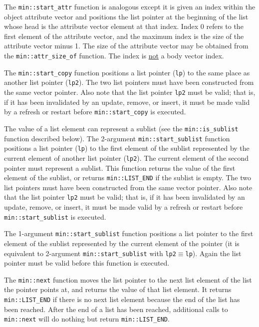 \documentclass[12pt]{article}
\newcommand{\EOL}{\penalty \exhyphenpenalty}
\begin{document}
The {\tt min::\EOL start\_\EOL attr} function is analogous except it is given
an index within the object attribute vector and positions the list pointer
at the beginning of the list whose head is the attribute vector element
at that index.  Index 0 refers to the first element of the attribute vector,
and the maximum index is the size of the attribute vector minus 1.
The size of the attribute vector may be obtained from the
{\tt min::\EOL attr\_\EOL size\_\EOL of} function.
The index is \underline{not} a body vector index.

The {\tt min::\EOL start\_\EOL copy} function
positions a list pointer ({\tt lp})
to the same place as another list pointer ({\tt lp2}).
The two list pointers must have been constructed from the same
vector pointer.
Also note that the list pointer {\tt lp2}
must be valid; that is, if it has been invalidated by
an update, remove, or insert, it must be made valid by a refresh or restart
before {\tt min::\EOL start\_\EOL copy} is executed.

The value of a list element can represent a sublist
(see the {\tt min::\EOL is\_\EOL sublist} function described below).
The 2-argument {\tt min::\EOL start\_\EOL sublist} function
positions a list pointer ({\tt lp})
to the first element of the sublist represented by the current
element of another list pointer ({\tt lp2}).
The current element of the second pointer must represent a sublist.
This function returns the value of the first element of
the sublist, or returns {\tt min::\EOL LIST\_\EOL END} if the sublist is empty.
The two list pointers must have been constructed from the same
vector pointer.
Also note that the list pointer {\tt lp2}
must be valid; that is, if it has been invalidated by
an update, remove, or insert, it must be made valid by a refresh or restart
before {\tt min::\EOL start\_\EOL sublist} is executed.

The 1-argument {\tt min::\EOL start\_\EOL sublist} function
positions a list pointer
to the first element of the sublist represented by the current
element of the pointer (it is equivalent to 2-argument
{\tt min::\EOL start\_\EOL sublist} with \verb|lp2|$\equiv$\verb|lp|).
Again the list pointer must be valid before this function is executed.

The {\tt min::\EOL next} function moves the list pointer
to the next list element of the
list the pointer points at, and returns the value of that
list element.  It returns {\tt min::\EOL LIST\_\EOL END} if there is
no next list element because the end of the list has been reached.
After the end of a list has been reached, additional
calls to {\tt min::next}
will do nothing but return {\tt min::\EOL LIST\_\EOL END}.
\end{document}

